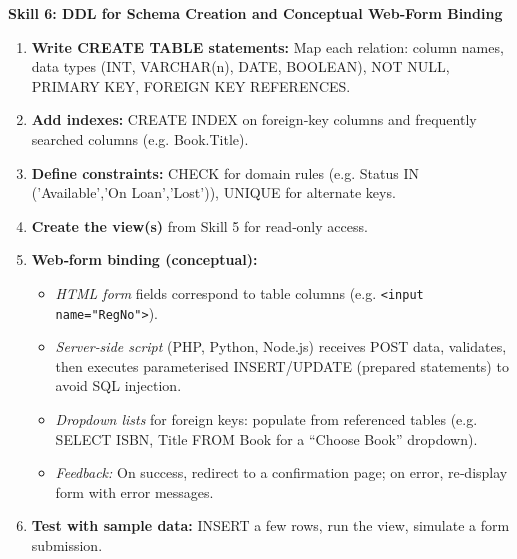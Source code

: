 \documentclass[11pt]{article}
\begin{document}
\textbf{Skill 6: DDL for Schema Creation and Conceptual Web‑Form Binding}\par
\begin{methode}
\begin{enumerate}
\item \textbf{Write CREATE TABLE statements:} Map each relation: column names, data types (INT, VARCHAR(n), DATE, BOOLEAN), NOT NULL, PRIMARY KEY, FOREIGN KEY REFERENCES.
\item \textbf{Add indexes:} CREATE INDEX on foreign‑key columns and frequently searched columns (e.g. Book.Title).
\item \textbf{Define constraints:} CHECK for domain rules (e.g. Status IN ('Available','On Loan','Lost')), UNIQUE for alternate keys.
\item \textbf{Create the view(s)} from Skill 5 for read‑only access.
\item \textbf{Web‑form binding (conceptual):}
\begin{itemize}
\item \emph{HTML form} fields correspond to table columns (e.g. \texttt{<input name="RegNo">}).
\item \emph{Server‑side script} (PHP, Python, Node.js) receives POST data, validates, then executes parameterised INSERT/UPDATE (prepared statements) to avoid SQL injection.
\item \emph{Dropdown lists} for foreign keys: populate from referenced tables (e.g. SELECT ISBN, Title FROM Book for a “Choose Book” dropdown).
\item \emph{Feedback:} On success, redirect to a confirmation page; on error, re‑display form with error messages.
\end{itemize}
\item \textbf{Test with sample data:} INSERT a few rows, run the view, simulate a form submission.
\end{enumerate}
\end{methode}
\end{document}
